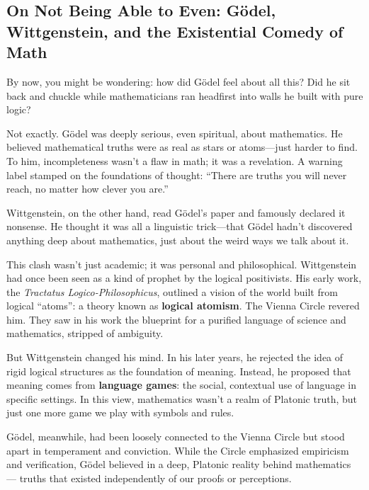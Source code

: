 \subsection{On Not Being Able to Even: Gödel, Wittgenstein, and the Existential Comedy of Math}

By now, you might be wondering: how did Gödel feel about all this? Did he sit back and chuckle while mathematicians ran headfirst into walls he built with pure logic?

Not exactly. Gödel was deeply serious, even spiritual, about mathematics. He believed mathematical truths were as real as stars or atoms—just harder to find. To him, incompleteness wasn’t a flaw in math; it was a revelation. A warning label stamped on the foundations of thought: “There are truths you will never reach, no matter how clever you are.”

\noindent Wittgenstein, on the other hand, read Gödel’s paper and famously declared it nonsense. He thought it was all a linguistic trick—that Gödel hadn’t discovered anything deep about mathematics, just about the weird ways we talk about it.

\medskip

\noindent This clash wasn’t just academic; it was personal and philosophical. Wittgenstein had once been seen as a kind of prophet by the logical positivists. His early work, the \emph{Tractatus Logico-Philosophicus}, outlined a vision of the world built from logical ``atoms'': a theory known as \textbf{logical atomism}. The Vienna Circle revered him. They saw in his work the blueprint for a purified language of science and mathematics, stripped of ambiguity.

But Wittgenstein changed his mind. In his later years, he rejected the idea of rigid logical structures as the foundation of meaning. Instead, he proposed that meaning comes from \textbf{language games}: the social, contextual use of language in specific settings. In this view, mathematics wasn’t a realm of Platonic truth, but just one more game we play with symbols and rules.

Gödel, meanwhile, had been loosely connected to the Vienna Circle but stood apart in temperament and conviction. While the Circle emphasized empiricism and verification, Gödel believed in a deep, Platonic reality behind mathematics --- truths that existed independently of our proofs or perceptions.

